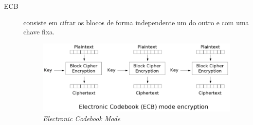\begin{description}
\item [ECB]consiste em cifrar os blocos de forma independente um do outro e com uma chave fixa.
\begin{figure}[h]
\centering
\includegraphics[keepaspectratio=true,scale=0.7]
	{figuras/ecb.eps}
	\caption[\textit{Electronic Codebook Mode}]{\textit{Electronic Codebook Mode}\protect\footnotemark}
	

\end{figure}
\end{description}

